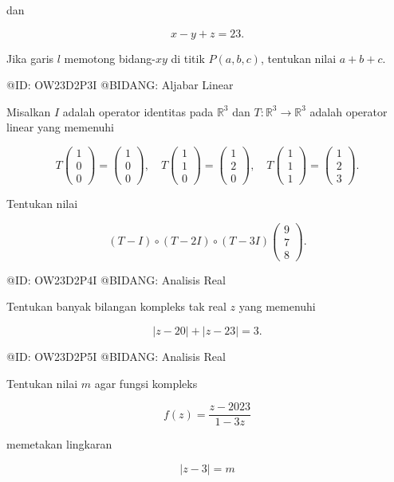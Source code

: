 dan

$$
x-y+z=23.
$$

Jika garis $l$ memotong bidang-$xy$ di titik $P(a,b,c)$, tentukan nilai $a+b+c$.

@ID: OW23D2P3I
@BIDANG: Aljabar Linear

Misalkan $I$ adalah operator identitas pada $\mathbb R^3$ dan $T:\mathbb R^3\to\mathbb R^3$ adalah operator linear yang memenuhi

$$
T\begin{pmatrix}1\\0\\0\end{pmatrix}
=
\begin{pmatrix}1\\0\\0\end{pmatrix},
\quad
T\begin{pmatrix}1\\1\\0\end{pmatrix}
=
\begin{pmatrix}1\\2\\0\end{pmatrix},
\quad
T\begin{pmatrix}1\\1\\1\end{pmatrix}
=
\begin{pmatrix}1\\2\\3\end{pmatrix}.
$$

Tentukan nilai

$$
(T-I)\circ(T-2I)\circ(T-3I)
\begin{pmatrix}9\\7\\8\end{pmatrix}.
$$

@ID: OW23D2P4I
@BIDANG: Analisis Real

Tentukan banyak bilangan kompleks tak real $z$ yang memenuhi

$$
|z-20|+|z-23|=3.
$$

@ID: OW23D2P5I
@BIDANG: Analisis Real

Tentukan nilai $m$ agar fungsi kompleks

$$
f(z)=\frac{z-2023}{1-3z}
$$

memetakan lingkaran

$$
|z-3|=m
$$

